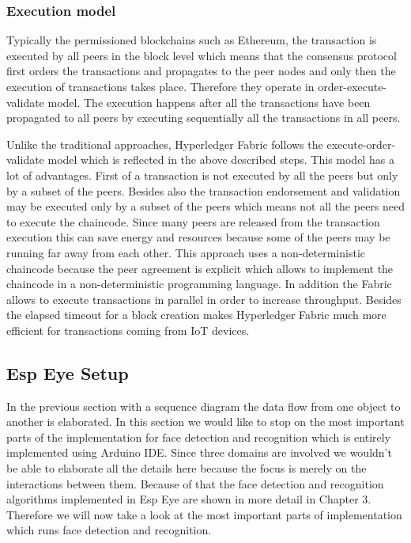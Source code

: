  \subsubsection{Execution model}
 
 
 Typically the permissioned blockchains such as Ethereum, the transaction is executed by all peers in the block level which means that the consensus protocol first orders the transactions and propagates to the peer nodes and only then the execution of transactions takes place. Therefore they operate in order-execute-validate model. The execution happens after all the transactions have been propagated to all peers by executing sequentially all the transactions in all peers.
 
 Unlike the traditional approaches, Hyperledger Fabric follows the execute-order-validate model which is reflected in the above described steps. This model has a lot of advantages. First of a transaction is not executed by all the peers but only by a subset of the peers. Besides also the transaction endorsement and validation may be executed only by a subset of the peers which means not all the peers need to execute the chaincode. Since many peers are released from the transaction execution this can save energy and resources because some of the peers may be running far away from each other. 
 This approach uses a non-deterministic chaincode because the peer agreement is explicit  which allows to implement the chaincode in a non-deterministic programming language. In addition the Fabric allows to execute transactions in parallel in order to increase throughput. Besides the elapsed timeout for a block creation makes Hyperledger Fabric much more efficient for transactions coming from IoT devices.
 
 
 
\subsection{Esp Eye Setup}

In the previous section with a sequence diagram the data flow from one object to another is elaborated. In this section we would like to stop on the most important parts of the implementation for face detection and recognition which is entirely implemented using Arduino IDE. Since three domains are involved we wouldn't be able to elaborate all the details here because the focus is merely on the interactions between them. Because of that the face detection and recognition algorithms implemented in Esp Eye are shown in more detail in Chapter 3. Therefore we will now take a look at the most important parts of implementation which runs face detection and recognition.

